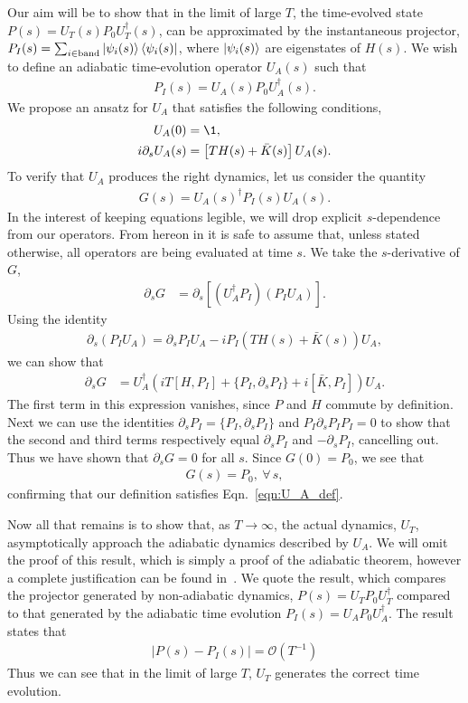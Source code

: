 Our aim will be to show that in the limit of large $T$, the time-evolved state $P(s) = U_T(s) P_0 U^{\dag}_T(s)$, can be approximated by the instantaneous projector, $P_I(s) = \sum_{i \in \textup{band}} \ket{\psi_i(s)} \bra{\psi_i(s)}$, where $\ket{\psi_i(s)}$ are eigenstates of $H(s)$. We wish to define an adiabatic time-evolution operator $U_A(s)$ such that
\begin{align}\label{eqn:U_A_def}
     P_I(s) = U_A(s) P_0 U_A^\dag(s).
\end{align}
We propose an ansatz for $U_A$ that satisfies the following conditions,
\begin{align}
    U_A(0) &= \1, \\
    i \partial_s U_A(s) &= \left [ TH(s) + \bar K(s) \right ] U_A(s).
\end{align}
To verify that $ U_A$ produces the right dynamics, let us consider the quantity
\begin{align}
    G(s) =  U_A(s)^\dag P_I(s) U_A(s).
\end{align}
In the interest of keeping equations legible, we will drop explicit $s$-dependence from our operators. From hereon in it is safe to assume that, unless stated otherwise, all operators are being evaluated at time $s$. We take the $s$-derivative of $ G$,
\begin{align}
    \partial_s  G &= \partial_s \left [ ( U_A^\dag  P_I)( P_I  U_A) \right ].
\end{align}
Using the identity
\begin{align}
    \partial_s ( P_I  U_A) = \partial_s P_I  U_A -i  P_I \left ( T H(s) + \bar K(s)  \right )  U_A,
\end{align}
we can show that
\begin{align}
    \partial_s  G &= 
    U_A^\dag \left ( iT [H,P_I] + \{P_I,\partial_s P_I\}  + i [\bar K,P_I] \right )U_A.
\end{align}
The first term in this expression vanishes, since $P$ and $H$ commute by definition. Next we can use the identities $\partial_s P_I = \{P_I, \partial_s P_I\}$ and $P_I \partial_s P_I P_I = 0$ to show that the second and third terms respectively equal $\partial_s P_I$ and $-\partial_s P_I$, cancelling out. Thus we have shown that $\partial_s G = 0$ for all $s$. Since $G(0) = P_0$, we see that
\begin{align}
    G(s) = P_0, \  \forall\, s,
\end{align}
confirming that our definition satisfies Eqn.~\ref{eqn:U_A_def}.

Now all that remains is to show that, as $ T \rightarrow \infty$, the actual dynamics, $U_T$, asymptotically approach the adiabatic dynamics described by $U_A$. We will omit the proof of this result, which is simply a proof of the adiabatic theorem, however a complete justification can be found in~\cite{avron_adiabatic_1987}. We quote the result, which compares the projector generated by non-adiabatic dynamics, $P(s) = U_T P_0 U^{\dag}_T$ compared to that generated by the adiabatic time evolution $P_I(s) = U_A P_0 U^{\dag}_A$. The result states that
\begin{align}
    |P(s) - P_I(s)| = \mathcal O (T^{-1})
\end{align}
Thus we can see that in the limit of large $T$, $U_T$ generates the correct time evolution.
